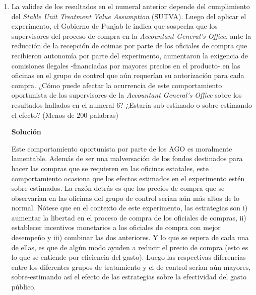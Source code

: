 \documentclass[a4paper, answers, addpoints, 11pt]{exam}
\newenvironment{solucion}{%
  \begin{mdframed}[
    backgroundcolor=blue!5,    %
    linecolor=blue!50,          %
    linewidth=2pt,              %
    leftmargin=10pt,            %
    rightmargin=8pt,           %
    topline=true,              %
    bottomline=true,            %
    roundcorner=10pt,           %
    innerleftmargin=10pt,       %
    innerrightmargin=10pt,      %
    innerbottommargin=10pt,     %
    innertopmargin=10pt         %
  ]%
  \begin{tcolorbox}[colframe=blue!50!black, colback=blue!50, coltitle=white, sharp corners=all, boxrule=1mm, width=\textwidth, halign=left, valign=center, top=0mm, bottom=0mm, left=0mm, right=0mm] \textbf{Solución} \end{tcolorbox} }{\end{mdframed}}
\begin{document}
\begin{enumerate}
    

    
   \item La validez de los resultados en el numeral anterior depende del cumplimiento del \textit{Stable Unit Treatment Value Assumption} (SUTVA). Luego del aplicar el experimento, el Gobierno de Punjab le indica que sospecha que los supervisores del proceso de compra en la \textit{Accountant General's Office}, ante la reducción de la recepción de coimas por parte de los oficiales de compra que recibieron autonomía por parte del experimento, aumentaron la exigencia de comisiones ilegales -financiadas por mayores precios en el producto- en las oficinas en el grupo de control que aún requerían su autorización para cada compra. ¿Cómo puede afectar la ocurrencia de este comportamiento oportunista de los supervisores de la \textit{Accountant General's Office} sobre los resultados hallados en el numeral 6? ¿Estaría sub-estimado o sobre-estimando el efecto? (Menos de 200 palabras)
   \begin{solucion}
   Este comportamiento oportunista por parte de los AGO es moralmente lamentable. Además de ser una malversación de los fondos destinados para hacer las compras que se requieren en las oficinas estatales, este comportamiento ocasiona que los efectos estimados en el experimento estén sobre-estimados. La razón detrás es que los precios de compra que se observarían en las oficinas del grupo de control serían aún más altos de lo normal. Nótese que en el contexto de este experimento, las estrategias son i) aumentar la libertad en el proceso de compra de los oficiales de compras, ii) establecer incentivos monetarios a los oficiales de compra con mejor desempeño y iii) combinar las dos anteriores. Y lo  que se espera de cada una de ellas, es que de algún modo ayuden a reducir el precio de compra (esto es lo que se entiende por eficiencia del gasto). Luego las respectivas diferencias entre los diferentes grupos de tratamiento y el de control serían aún mayores, sobre-estimando así el efecto de las estrategias sobre la efectividad del gasto público.
   \end{solucion}

   


\end{enumerate}
\end{document}
